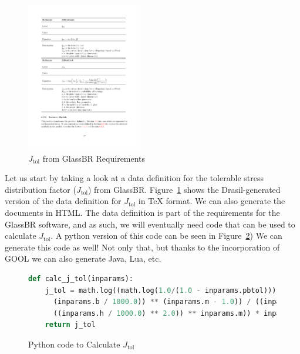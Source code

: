 \documentclass[sigconf]{acmart}
\newcommand{\jtol}{$J_{\mbox{tol}}$}
\begin{document}

\begin{figure}
\begin{center}
\includegraphics[width=0.45\textwidth]{./figures/Jtol_pdf.pdf}
\end{center}
\caption{\jtol{} from GlassBR Requirements}
\label{Fig_Jtolpdf}
\end{figure}

Let us start by taking a look at a data definition for the tolerable stress 
distribution factor (\jtol{}) from GlassBR. Figure~\ref{Fig_Jtolpdf} 
shows the Drasil-generated version of the data definition for 
\jtol{} in TeX format. We can also generate the documents in HTML. The data definition
is part of the requirements for the GlassBR software, and as such, we 
will eventually need code that can be
used to calculate \jtol{}. 
A python version of this code can be seen in Figure~\ref{Fig_JtolPython})
We can generate this code as well! Not only 
that, but thanks to the incorporation of GOOL we can also generate Java, Lua, 
etc. 

\begin{figure}
\begin{lstlisting}[language=python, frame=single, showstringspaces=false]
def calc_j_tol(inparams):
    j_tol = math.log((math.log(1.0/(1.0 - inparams.pbtol))) * ((((inparams.a / 1000.0) * 
      (inparams.b / 1000.0)) ** (inparams.m - 1.0)) / ((inparams.k * (((inparams.E * 1000.0) * 
      ((inparams.h / 1000.0) ** 2.0)) ** inparams.m)) * inparams.ldf))) 
    return j_tol
\end{lstlisting}
\caption{Python code to Calculate \jtol{}}
\label{Fig_JtolPython}
\end{figure}
\end{document}

